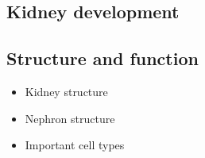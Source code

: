 \documentclass[11pt,a4paper,titlepage,twoside,openright]{style/unimelbthesis}
\theoremstyle{definition}
\theoremstyle{definition}
\theoremstyle{definition}
\theoremstyle{remark}
\begin{document}
\begin{mainmatter}
\hypertarget{kidney-development}{%
\section{Kidney development}\label{kidney-development}}

\hypertarget{structure-and-function}{%
\subsection{Structure and function}\label{structure-and-function}}

\begin{itemize}
\tightlist
\item
  Kidney structure
\item
  Nephron structure
\item
  Important cell types
\end{itemize}


\end{mainmatter}
\end{document}
